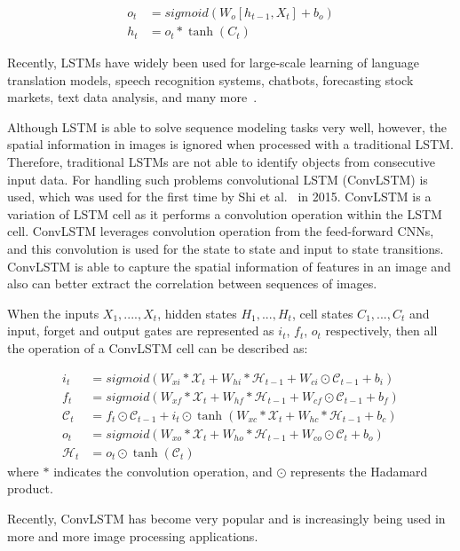 \begin{equation}
\begin{aligned}
o_{t} &=sigmoid\left(W_{o}\left[h_{t-1}, X_{t}\right]+b_{o}\right) \\
h_{t} &=o_{t} * \tanh \left(C_{t}\right)
\end{aligned}
\label{eq:eq4}
\end{equation} 

Recently, LSTMs have widely been used for large-scale learning of language translation models, speech recognition systems, chatbots, forecasting stock markets, text data analysis, and many more~\cite{graves2014towards, cho2014properties}. 

Although LSTM is able to solve sequence modeling tasks very well, however, the spatial information in images is ignored when processed with a traditional LSTM.
Therefore, traditional LSTMs are not able to identify objects from consecutive input data. 
For handling such problems convolutional LSTM (ConvLSTM) is used, which was used for the first time by Shi et al.~\cite{xingjian2015convolutional} in 2015. 
ConvLSTM is a variation of LSTM cell as it performs a convolution operation within the LSTM cell.
ConvLSTM leverages convolution operation from the feed-forward CNNs, and this convolution is used for the state to state and input to state transitions.
ConvLSTM is able to capture the spatial information of features in an image and also can better extract the correlation between sequences of images. 

When the inputs $X_1, ...., X_t$, hidden states $H_1, ..., H_t$, cell states $C_1, ..., C_t$ and input, forget and output gates are represented as $i_t$, $f_t$, $o_t$ respectively, then all the operation of a ConvLSTM cell can be described as:

\begin{equation}
\begin{aligned}
i_{t} &=sigmoid\left(W_{x i} * \mathcal{X}_{t}+W_{h i} * \mathcal{H}_{t-1}+W_{c i} \odot \mathcal{C}_{t-1}+b_{i}\right) \\
f_{t} &=sigmoid\left(W_{x f} * \mathcal{X}_{t}+W_{h f} * \mathcal{H}_{t-1}+W_{c f} \odot \mathcal{C}_{t-1}+b_{f}\right) \\
\mathcal{C}_{t} &=f_{t} \odot \mathcal{C}_{t-1}+i_{t} \odot \tanh \left(W_{x c} * \mathcal{X}_{t}+W_{h c} * \mathcal{H}_{t-1}+b_{c}\right) \\
o_{t} &=sigmoid\left(W_{x o} * \mathcal{X}_{t}+W_{h o} * \mathcal{H}_{t-1}+W_{c o} \odot \mathcal{C}_{t}+b_{o}\right) \\
\mathcal{H}_{t} &=o_{t} \odot \tanh \left(\mathcal{C}_{t}\right)
\end{aligned}
\label{eq:eq5}
\end{equation}
where $*$ indicates the convolution operation, and $\odot$ represents the Hadamard product.

Recently, ConvLSTM has become very popular and is increasingly being used in more and more image processing applications.  
